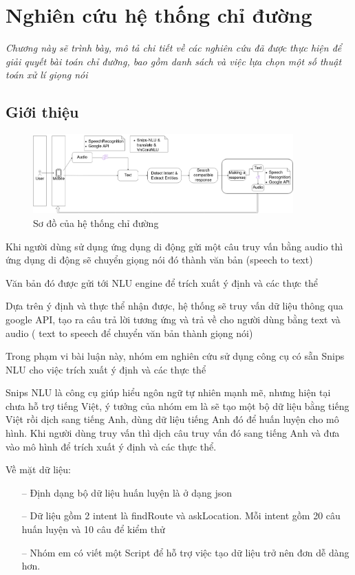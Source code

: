 \chapter{Nghiên cứu hệ thống chỉ đường}
\label{Chapter3}

\emph{Chương này sẽ trình bày, mô tả chi tiết về các nghiên cứu đã được thực hiện để giải quyết bài toán chỉ đường, bao gồm danh sách và việc lựa chọn một số thuật toán xử lí giọng nói}

\section{Giới thiệu}
\begin{figure}[htp]
    \centering
    \includegraphics[width=10cm]{images/Structure-description.png}
    \caption{Sơ đồ của hệ thống chỉ đường}
    \label{fig:sodohethongchiduong}

\end{figure}

Khi người dùng sử dụng ứng dụng di động gửi một câu truy vấn bằng audio thì ứng dụng di động sẽ chuyển giọng nói đó thành văn bản (speech to text)

Văn bản đó được gửi tới NLU engine để trích xuất ý định và các thực thể

Dựa trên ý định và thực thể nhận được, hệ thống sẽ truy vấn dữ liệu thông qua google API, tạo ra câu trả lời tương ứng và trả về cho người dùng bằng text và audio ( text to speech để chuyển văn bản thành giọng nói)

Trong phạm vi bài luận này, nhóm em nghiên cứu sử dụng công cụ có sẵn Snips NLU\cite{Snipsnlu} cho việc trích xuất ý định và các thực thể

Snips NLU là công cụ giúp hiểu ngôn ngữ tự nhiên mạnh mẽ, nhưng hiện tại chưa hỗ trợ tiếng Việt, ý tưởng của nhóm em là sẽ tạo một bộ dữ liệu bằng tiếng Việt rồi dịch sang tiếng Anh, dùng dữ liệu tiếng Anh đó để huấn luyện cho mô hình. Khi người dùng truy vấn thì dịch câu truy vấn đó sang tiếng Anh và đưa vào mô hình để trích xuất ý định và các thực thể.

Về mặt dữ liệu:
\begin{itemize}
    \item[--] Định dạng bộ dữ liệu huấn luyện là ở dạng json
    \item[--] Dữ liệu gồm 2 intent là findRoute và askLocation. Mỗi intent gồm 20 câu huấn luyện và 10 câu để kiểm thử
    \item[--] Nhóm em có viết một Script để hỗ trợ việc tạo dữ liệu trở nên đơn dễ dàng hơn.
\end{itemize}

